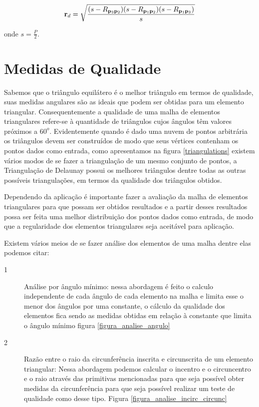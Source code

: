 \documentclass[12pt,a4paper]{book}
\begin{document}
\begin{equation}
\mathbf{r}_{d}=\sqrt{\frac{(s-R_{\mathbf{p}_{3}\mathbf{p}_{2}})(s-R_{\mathbf{%
p}_{1}\mathbf{p}_{2}})(s-R_{\mathbf{p}_{1}\mathbf{p}_{3}})}{s}}
\end{equation}

onde $s=\frac{P}{2}$.


\section{Medidas de Qualidade}

Sabemos que o tri\^angulo equil\'atero \'e o melhor tri\^angulo em termos de qualidade, suas medidas angulares s\~ao as ideais que podem ser obtidas para um elemento triangular. Consequentemente a qualidade de uma malha de elementos triangulares refere-se \`a quantidade de tri\^angulos cujos \^angulos t\^em valores pr\'oximos a $60^o$. Evidentemente quando \'e dado uma nuvem de pontos arbitr\'aria os tri\^angulos devem ser constru\'idos de modo que seus v\'ertices contenham os pontos dados como entrada, como apresentamos na figura \ref{triangulations} existem v\'arios modos de se fazer a triangula\c{c}\~{a}o de um mesmo conjunto de pontos, a Triangula\c{c}\~{a}o de Delaunay possui os melhores tri\^angulos dentre todas as outras poss\'iveis triangula\c{c}\~{o}es, em termos da qualidade dos tri\^angulos obtidos.

Dependendo da aplica\c{c}\~{a}o \'e importante fazer a avalia\c{c}\~{a}o da malha de elementos triangulares para
que possam ser obtidos resultados e a partir desses resultados possa ser feita uma melhor distribui\c{c}\~{a}o dos pontos dados como entrada, de modo que a regularidade dos elementos triangulares seja aceit\'avel para aplica\c{c}\~{a}o.

Existem v\'arios meios de se fazer an\'alise dos elementos de uma malha dentre elas podemos citar: 

\begin{description}
\item[1] An\'alise por \^angulo m\'inimo: nessa abordagem \'e feito o calculo independente de cada \^angulo de cada elemento na malha e limita esse o menor dos \^angulos por uma constante, o c\'alculo da qualidade dos elementos fica sendo as medidas obtidas em rela\c{c}\~{a}o \`a constante que limita o \^angulo m\'inimo figura \ref{figura_analise_angulo}

\item[2] Raz\~ao entre o raio da circunfer\^encia inscrita e circunscrita de um elemento triangular: Nessa abordagem podemos calcular o incentro e o circuncentro e o raio atrav\'es das primitivas mencionadas para que seja poss\'ivel obter medidas da circunfer\^encia para que seja poss\'ivel realizar um teste de qualidade como desse tipo. Figura \ref{figura_analise_incirc_circunc}
\end{description}
\end{document}

